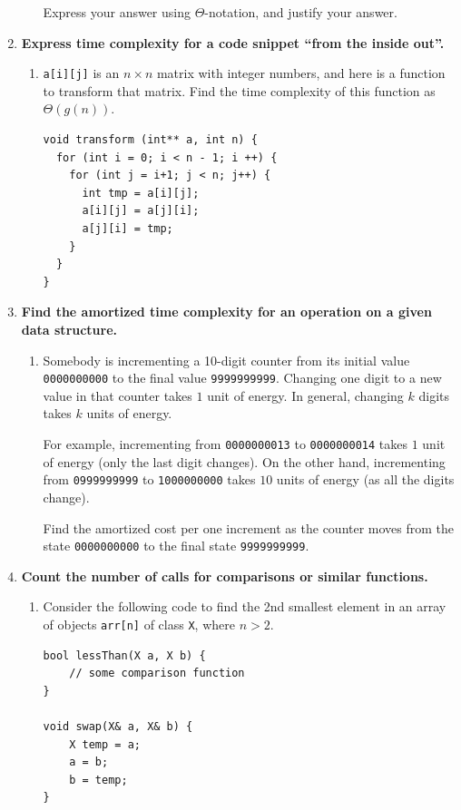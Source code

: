 \documentclass[a4paper,12pt]{article}
\begin{document}
\begin{enumerate}[label=3.\Alph*.]
\begin{enumerate}
Express your
answer using $\Theta$-notation, and justify your answer.
\end{enumerate}
\item {\bf Express time complexity for a code snippet ``from the inside out''.}
\begin{enumerate} 
\item {\tt a[i][j]} is an $n \times n$ matrix with integer numbers, and 
here is a function to transform that matrix. 
Find the time complexity of this function as $\Theta(g(n))$. 
\begin{verbatim}
void transform (int** a, int n) {
  for (int i = 0; i < n - 1; i ++) {
    for (int j = i+1; j < n; j++) {
      int tmp = a[i][j];
      a[i][j] = a[j][i];
      a[j][i] = tmp;
    }
  }
}
\end{verbatim}
\end{enumerate}
\item {\bf Find the amortized time complexity for an operation on a given data structure.}
\begin{enumerate}
\item
Somebody is incrementing a 10-digit counter from its initial value {\tt 0000000000} 
to the final value {\tt 9999999999}. 
Changing one digit to a new value in that counter takes $1$ unit of energy. 
In general, changing $k$ digits takes $k$ units of energy. 

For example, incrementing from {\tt 0000000013} to {\tt 0000000014} 
takes $1$ unit of energy (only the last digit changes). 
On the other hand, incrementing from {\tt 0999999999} to {\tt 1000000000} 
takes $10$ units of energy (as all the digits change). 

Find the amortized cost per one increment as the counter moves from the state
{\tt 0000000000} 
to the final state {\tt 9999999999}.
\end{enumerate}

\item {\bf Count the number of calls for comparisons or similar functions.}
\begin{enumerate}
\item Consider the following code to find the 2nd smallest element in an array
of objects {\tt arr[n]} of class {\tt X}, where $n > 2$. 

\begin{verbatim}
bool lessThan(X a, X b) { 
    // some comparison function
}

void swap(X& a, X& b) {
    X temp = a;
    a = b;
    b = temp;
}


\end{verbatim}
\end{enumerate}
\end{enumerate}
\end{document}

